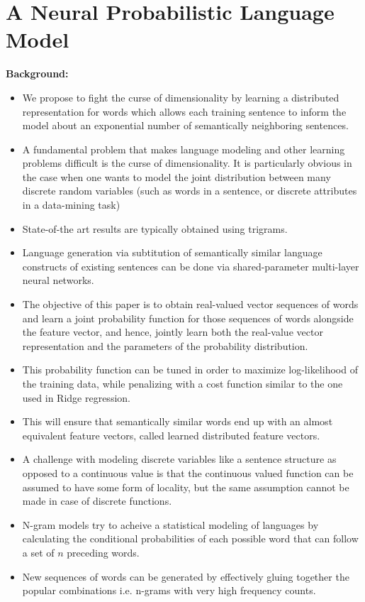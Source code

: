 \documentclass[11pt,a4paper]{article}
\begin{document}


\section{A Neural Probabilistic Language Model} %
\label{sec:a_neural_probabilistic_language_model}

  \textbf{Background:}
  \begin{itemize}
    \item 
    We propose to fight the curse of dimensionality by learning a distributed representation for words which allows each training sentence to inform the model about an exponential number of semantically neighboring sentences.
    \item 
    A fundamental problem that makes language modeling and other learning problems difficult is the curse of dimensionality. It is particularly obvious in the case when one wants to model the joint distribution between many discrete random variables (such as words in a sentence, or discrete attributes in a data-mining task)
    \item 
    State-of-the art results are typically obtained using trigrams.
    \item 
    Language generation via subtitution of semantically similar language constructs of existing sentences can be done via shared-parameter multi-layer neural networks.
    \item 
    The objective of this paper is to obtain real-valued vector sequences of words and learn a joint probability function for those sequences of words alongside the feature vector, and hence, jointly learn both the real-value vector representation and the parameters of the probability distribution.
    \item 
    This probability function can be tuned in order to maximize log-likelihood of the training data, while penalizing with a cost function similar to the one used in Ridge regression.
    \item 
    This will ensure that semantically similar words end up with an almost equivalent feature vectors, called learned distributed feature vectors.
    \item 
    A challenge with modeling discrete variables like a sentence structure as opposed to a continuous value is that the continuous valued function can be assumed to have some form of locality, but the same assumption cannot be made in case of discrete functions.
    \item 
    N-gram models try to acheive a statistical modeling of languages by calculating the conditional probabilities of each possible word that can follow a set of $n$ preceding words.
    \item 
    New sequences of words can be generated by effectively gluing together the popular combinations i.e. n-grams with very high frequency counts.
  \end{itemize}
\end{document}
